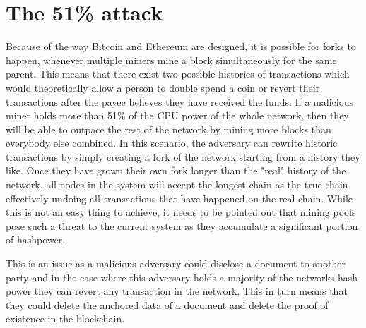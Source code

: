 \documentclass[12pt,msc,a4paper,oneside]{ucl_thesis}
\begin{document}
\section{The 51\% attack}
Because of the way Bitcoin and Ethereum are designed, it is possible for forks to happen, whenever multiple miners mine a block simultaneously for the same parent. This means that there exist two possible histories of transactions which would theoretically allow a person to double spend a coin or revert their transactions after the payee believes they have received the funds. If a malicious miner holds more than 51\% of the CPU power of the whole network, then they will be able to outpace the rest of the network by mining more blocks than everybody else combined. In this scenario, the adversary can rewrite historic transactions by simply creating a fork of the network starting from a history they like. Once they have grown their own fork longer than the "real" history of the network, all nodes in the system will accept the longest chain as the true chain effectively undoing all transactions that have happened on the real chain. While this is not an easy thing to achieve, it needs to be pointed out that mining pools pose such a threat to the current system as they accumulate a significant portion of hashpower.

This is an issue as a malicious adversary could disclose a document to another party and in the case where this adversary holds a majority of the networks hash power they can revert any transaction in the network. This in turn means that they could delete the anchored data of a document and delete the proof of existence in the blockchain.
\end{document}
